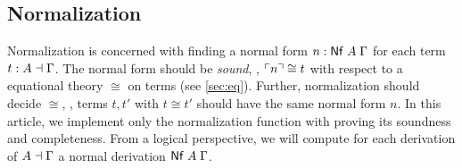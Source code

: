 \documentclass[a4paper,USenglish,cleveref, autoref]{lipics-v2019}
\begin{document}



\subsection{Normalization}

Normalization is concerned with finding a normal form
$n : \mathsf{Nf}\;A\;\Gamma$ for each term $t : A \dashv \Gamma$.
The normal form should be \emph{sound},
\ie, $\ulcorner n\urcorner \cong t$
with respect to a equational theory $\cong$ on terms
(see \cref{sec:eq}).
Further, normalization should decide $\cong$, \ie,
terms $t,t'$ with $t \cong t'$ should have the same normal form $n$.
In this article, we implement only the normalization function
with proving its soundness and completeness.
From a logical perspective, we will compute for each derivation of $A
\dashv \Gamma$ a normal derivation $\mathsf{Nf}\;A\;\Gamma$.


\end{document}

